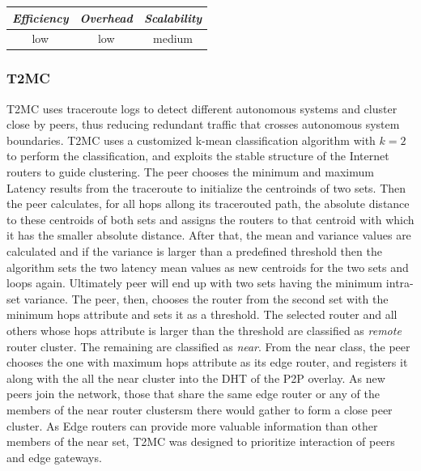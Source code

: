 \begin{center}
\begin{tabular}{ccc}
\emph{Efficiency} & \emph{Overhead} & \emph{Scalability} \\
\hline
low &
%
low &
%
medium
\end{tabular}
\end{center}

\subsubsection{T2MC}
T2MC \cite{SLCGZ2008} uses traceroute logs to detect different autonomous
systems and cluster close by peers, thus reducing redundant traffic that crosses
autonomous system boundaries. T2MC uses a customized k-mean classification
algorithm with $k=2$ to perform the classification, and exploits the stable
structure of the Internet routers to guide clustering. The peer chooses the
minimum and maximum Latency results from the traceroute to initialize the
centroinds of two sets. Then the peer calculates, for all hops allong its
tracerouted path, the absolute distance to these centroids of both sets and
assigns the routers to that centroid with which it has the smaller absolute
distance. After that, the mean and variance values are calculated and if the
variance is larger than a predefined threshold then the algorithm sets the two
latency mean values as new centroids for the two sets and loops again.
Ultimately peer will end up with two sets having the minimum intra-set variance.
The peer, then, chooses the router from the second set with the minimum hops
attribute and sets it as a threshold. The selected router and all others whose
hops attribute is larger than the threshold are classified as \emph{remote}
router cluster. The remaining are classified as \emph{near}. From the near
class, the peer chooses the one with maximum hops attribute as its edge router,
and registers it along with the all the near cluster into the DHT of the P2P
overlay. As new peers join the network, those that share the same edge router
or any of the members of the near router clustersm there would gather to form a
close peer cluster. As Edge routers can provide more valuable information than
other members of the near set, T2MC was designed to prioritize interaction of
peers and edge gateways.

%
%
%


